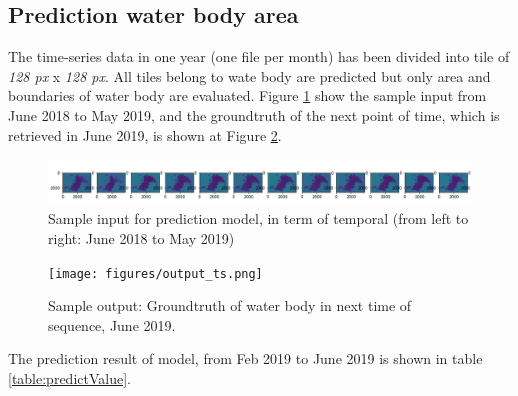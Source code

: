 \subsection{Prediction water body area}



The time-series data in one year (one file per month) has been divided into tile of \textit{128 px } x \textit{128 px}. All tiles belong to wate body are predicted but only area and boundaries of water body are evaluated. Figure \ref{fig:inputTs} show the sample input from June 2018 to May 2019, and the groundtruth of the next point of time, which is retrieved in June 2019, is shown at Figure \ref{fig:outputTs}.

\begin{figure}[h!]
	\centering
	\includegraphics[width=1\textwidth]{figures/input_ts.png}
	\caption{Sample input for prediction model, in term of temporal (from left to right: June 2018 to May 2019)}
	\label{fig:inputTs}
\end{figure}

\begin{figure}[h!]
	\centering
	\texttt{[image: figures/output\_ts.png]}
	\caption{Sample output: Groundtruth of water body in next time of sequence, June 2019.}
	\label{fig:outputTs}
\end{figure}

The prediction result of model, from Feb 2019 to June 2019 is shown in table \ref{table:predictValue}.


